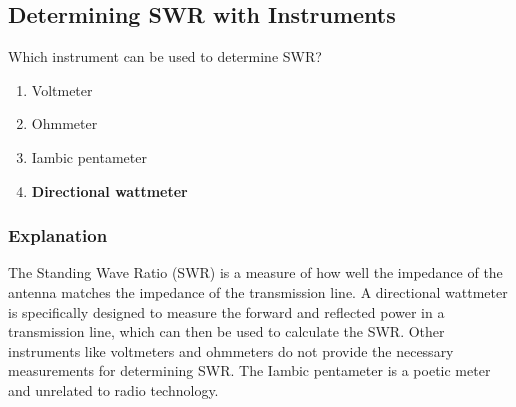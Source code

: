 \subsection{Determining SWR with Instruments}
\label{T7C08}

\begin{tcolorbox}[colback=gray!10!white,colframe=black!75!black,title=T7C08]
Which instrument can be used to determine SWR?
\begin{enumerate}[noitemsep]
    \item Voltmeter
    \item Ohmmeter
    \item Iambic pentameter
    \item \textbf{Directional wattmeter}
\end{enumerate}
\end{tcolorbox}

\subsubsection*{Explanation}
The Standing Wave Ratio (SWR) is a measure of how well the impedance of the antenna matches the impedance of the transmission line. A directional wattmeter is specifically designed to measure the forward and reflected power in a transmission line, which can then be used to calculate the SWR. Other instruments like voltmeters and ohmmeters do not provide the necessary measurements for determining SWR. The Iambic pentameter is a poetic meter and unrelated to radio technology.